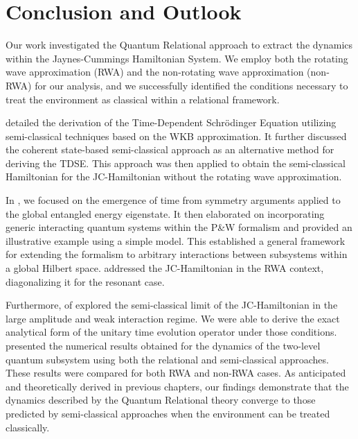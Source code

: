 \chapter{Conclusion and Outlook\label{chap:conclusion}}




Our work investigated the Quantum Relational approach to extract the dynamics within the Jaynes-Cummings Hamiltonian System. We employ both the rotating wave approximation (RWA) and the non-rotating wave approximation (non-RWA) for our analysis, and we successfully identified the conditions necessary to treat the environment as classical within a relational framework.

 detailed the derivation of the Time-Dependent Schrödinger Equation utilizing semi-classical techniques based on the WKB approximation. It further discussed the coherent state-based semi-classical approach as an alternative method for deriving the TDSE. This approach was then applied to obtain the semi-classical Hamiltonian for the JC-Hamiltonian without the rotating wave approximation.

In , we focused on the emergence of time from symmetry arguments applied to the global entangled energy eigenstate. It then elaborated on incorporating generic interacting quantum systems within the P\&W formalism and provided an illustrative example using a simple model. This established a general framework for extending the formalism to arbitrary interactions between subsystems within a global Hilbert space.  addressed the JC-Hamiltonian in the RWA context, diagonalizing it for the resonant case. 

Furthermore,  of  explored the semi-classical limit of the JC-Hamiltonian in the large amplitude and weak interaction regime. We were able to derive the exact analytical form of the unitary time evolution operator under those conditions.  presented the numerical results obtained for the dynamics of the two-level quantum subsystem using both the relational and semi-classical approaches. These results were compared for both RWA and non-RWA cases. As anticipated and theoretically derived in previous chapters, our findings demonstrate that the dynamics described by the Quantum Relational theory converge to those predicted by semi-classical approaches when the environment can be treated classically.

